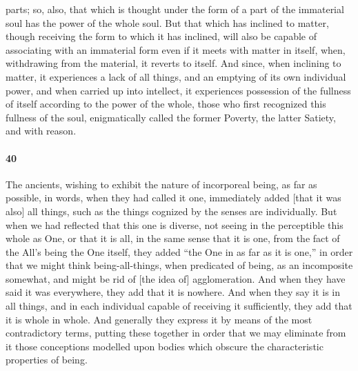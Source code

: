 \documentclass[12pt]{article}
\begin{document}
parts; so, also, that which is thought under the form of a part of the
immaterial soul has the power of the whole soul. But that which has inclined to
matter, though receiving the form to which it has inclined, will also be
capable of associating with an immaterial form even if it meets with matter in
itself, when, withdrawing from the material, it reverts to itself. And since,
when inclining to matter, it experiences a lack of all things, and an emptying
of its own individual power, and when carried up into intellect, it experiences
possession of the fullness of itself according to the power of the whole, those
who first recognized this fullness of the soul, enigmatically called the former
Poverty, the latter Satiety, and with reason.

\paragraph{40} The ancients, wishing to exhibit the nature of incorporeal
being, as far as possible, in words, when they had called it one, immediately
added [that it was also] all things, such as the things cognized by the senses
are individually. But when we had reflected that this one is diverse, not
seeing in the perceptible this whole as One, or that it is all, in the same
sense that it is one, from the fact of the All's being the One itself, they
added ``the One in as far as it is one,'' in order that we might think
being-all-things, when predicated of being, as an incomposite somewhat, and
might be rid of [the idea of] agglomeration. And when they have said it was
everywhere, they add that it is nowhere. And when they say it is in all things,
and in each individual capable of receiving it sufficiently, they add that it
is whole in whole. And generally they express it by means of the most
contradictory terms, putting these together in order that we may eliminate from
it those conceptions modelled upon bodies which obscure the characteristic
properties of being.
\end{document}
